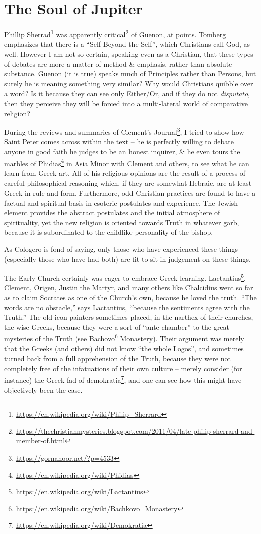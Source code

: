 \section{The Soul of Jupiter}

Phillip Sherrad\footnote{\url{https://en.wikipedia.org/wiki/Philip\_Sherrard}} was apparently critical\footnote{\url{https://thechristianmysteries.blogspot.com/2011/04/late-philip-sherrard-and-member-of.html}} of Guenon, at points. Tomberg emphasizes that there is a ``Self Beyond the Self'', which Christians call God, as well. However I am not so certain, speaking even as a Christian, that these types of debates are more a matter of method \& emphasis, rather than absolute substance. Guenon (it is true) speaks much of Principles rather than Persons, but surely he is meaning something very similar? Why would Christians quibble over a word? Is it because they can see only Either/Or, and if they do not \emph{disputato}, then they perceive they will be forced into a multi-lateral world of comparative religion?

During the reviews and summaries of Clement's Journal\footnote{\url{https://gornahoor.net/?p=4533}}, I tried to show how Saint Peter comes across within the text -- he is perfectly willing to debate anyone in good faith he judges to be an honest inquirer, \& he even tours the marbles of Phidias\footnote{\url{https://en.wikipedia.org/wiki/Phidias}} in Asia Minor with Clement and others, to see what he can learn from Greek art. All of his religious opinions are the result of a process of careful philosophical reasoning which, if they are somewhat Hebraic, are at least Greek in rule and form. Furthermore, odd Christian practices are found to have a factual and spiritual basis in esoteric postulates and experience. The Jewish element provides the abstract postulates and the initial atmosphere of spirituality, yet the new religion is oriented towards Truth in whatever garb, because it is subordinated to the childlike personality of the bishop.

As Cologero is fond of saying, only those who have experienced these things (especially those who have had both) are fit to sit in judgement on these things.

The Early Church certainly was eager to embrace Greek learning. Lactantius\footnote{\url{https://en.wikipedia.org/wiki/Lactantius}}, Clement, Origen, Justin the Martyr, and many others like Chalcidius went so far as to claim Socrates as one of the Church's own, because he loved the truth. ``The words are no obstacle,'' says Lactantius, ``because the sentiments agree with the Truth.'' The old icon painters sometimes placed, in the narthex of their churches, the wise Greeks, because they were a sort of ``ante-chamber'' to the great mysteries of the Truth (see Bachovo\footnote{\url{https://en.wikipedia.org/wiki/Bachkovo\_Monastery}} Monastery). Their argument was merely that the Greeks (and others) did not know ``the whole Logos'', and sometimes turned back from a full apprehension of the Truth, because they were not completely free of the infatuations of their own culture -- merely consider (for instance) the Greek fad of demokratia\footnote{\url{https://en.wikipedia.org/wiki/Demokratia}}, and one can see how this might have objectively been the case.

